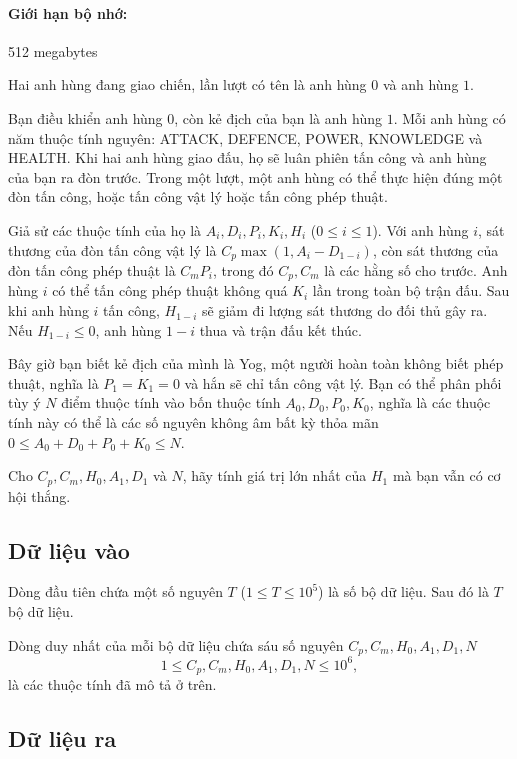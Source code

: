 \documentclass[11pt]{article}
\begin{document}
\paragraph{Giới hạn bộ nhớ:} 512 megabytes

Hai anh hùng đang giao chiến, lần lượt có tên là anh hùng \(0\) và anh hùng
\(1\).

Bạn điều khiển anh hùng \(0\), còn kẻ địch của bạn là anh hùng \(1\). Mỗi
anh hùng có năm thuộc tính nguyên: ATTACK, DEFENCE, POWER, KNOWLEDGE và
HEALTH. Khi hai anh hùng giao đấu, họ sẽ luân phiên tấn công và anh hùng của
bạn ra đòn trước. Trong một lượt, một anh hùng có thể thực hiện đúng một đòn
tấn công, hoặc tấn công vật lý hoặc tấn công phép thuật.

Giả sử các thuộc tính của họ là \(A_i,D_i,P_i,K_i,H_i\) (\(0\le i\le 1\)).
Với anh hùng \(i\), sát thương của đòn tấn công vật lý là
\(C_p\max(1,A_i-D_{1-i})\), còn sát thương của đòn tấn công phép thuật là
\(C_mP_i\), trong đó \(C_p,C_m\) là các hằng số cho trước. Anh hùng \(i\) có
thể tấn công phép thuật không quá \(K_i\) lần trong toàn bộ trận đấu. Sau khi
anh hùng \(i\) tấn công, \(H_{1-i}\) sẽ giảm đi lượng sát thương do đối thủ
gây ra. Nếu \(H_{1-i}\le 0\), anh hùng \(1-i\) thua và trận đấu kết thúc.

Bây giờ bạn biết kẻ địch của mình là Yog, một người hoàn toàn không biết
phép thuật, nghĩa là \(P_1=K_1=0\) và hắn sẽ chỉ tấn công vật lý. Bạn có thể
phân phối tùy ý \(N\) điểm thuộc tính vào bốn thuộc tính
\(A_0,D_0,P_0,K_0\), nghĩa là các thuộc tính này có thể là các số nguyên
không âm bất kỳ thỏa mãn \(0\le A_0+D_0+P_0+K_0\le N\).

Cho \(C_p,C_m,H_0,A_1,D_1\) và \(N\), hãy tính giá trị lớn nhất của \(H_1\)
mà bạn vẫn có cơ hội thắng.

\subsection*{Dữ liệu vào}

Dòng đầu tiên chứa một số nguyên \(T\) (\(1\le T\le 10^5\)) là số bộ dữ
liệu. Sau đó là \(T\) bộ dữ liệu.

Dòng duy nhất của mỗi bộ dữ liệu chứa sáu số nguyên
\(C_p,C_m,H_0,A_1,D_1,N\)
\[
  1\le C_p,C_m,H_0,A_1,D_1,N\le 10^6,
\]
là các thuộc tính đã mô tả ở trên.

\subsection*{Dữ liệu ra}
\end{document}
